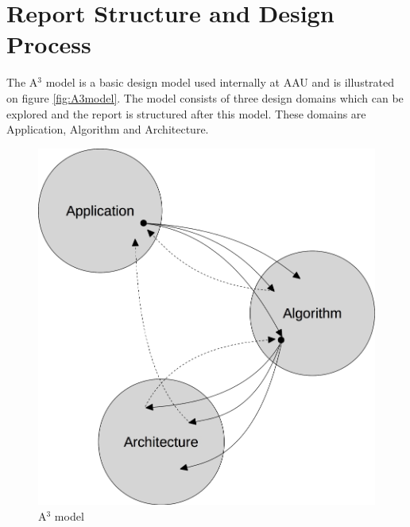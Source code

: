 \section{Report Structure and Design Process}\label{sec:a3model}
The A$^3$ model is a basic design model used internally at AAU and is illustrated on figure \vref{fig:A3model}. The model consists of three design domains which can be explored and the report is structured after this model. These domains are Application, Algorithm and Architecture.\\
\begin{figure}[ht!]
  \centering
  \includegraphics[scale=0.25]{figures/A3model.jpg}
  \caption{A$^3$ model}
  \label{fig:A3model}
\end{figure}

